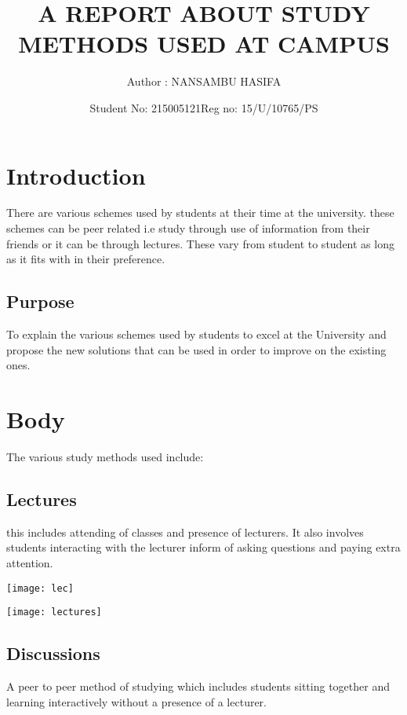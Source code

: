 \documentclass{article}
\begin{document}
		\title{A REPORT ABOUT STUDY METHODS USED AT CAMPUS}
		\author{Author :  NANSAMBU HASIFA }
		\date{Student No: 215005121}
                      \date{Reg no: 15/U/10765/PS}
		\maketitle
	

	\tableofcontents



\section{Introduction}
There are various schemes used by students at their time at the university. these schemes can be peer related i.e study through use of information from their friends or it can be through lectures. These vary from student to student as long as it fits with in their preference.


\subsection{Purpose}
 To explain the various schemes used by students to excel at the University and  propose the new solutions that can be used in order to improve on the existing ones.


\section{Body}

 The various study methods used include:

\subsection{Lectures}
this includes attending of classes and presence of lecturers. It also involves students interacting with the lecturer inform of asking questions and paying extra attention.

\graphicspath{ {methods/} }

\texttt{[image: lec]}


\graphicspath{ {methods/} }

\texttt{[image: lectures]}



\subsection{Discussions}
A peer to peer method of studying which includes students sitting together and learning interactively without a presence of a lecturer.
\end{document}
